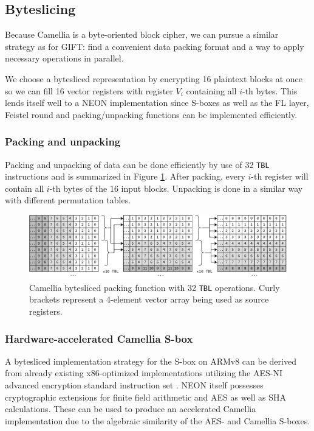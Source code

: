 \subsection{Byteslicing}

Because Camellia is a byte-oriented block cipher, we can pursue a similar
strategy as for GIFT: find a convenient data packing format and a way to apply
necessary operations in parallel.

We choose a bytesliced representation by encrypting 16 plaintext blocks at once
so we can fill 16 vector registers with register $V_i$ containing all $i$-th
bytes. This lends itself well to a NEON implementation since S-boxes as well as
the FL layer, Feistel round and packing/unpacking functions can be implemented
efficiently.

\subsubsection{Packing and unpacking}

Packing and unpacking of data can be done efficiently by use of 32 \texttt{TBL}
instructions and is summarized in Figure \ref{fig:byteslicing}. After
packing, every $i$-th register will contain all $i$-th bytes of the 16 input
blocks. Unpacking is done in a similar way with different permutation tables.

\begin{figure}[h!]
    \centering
    \includegraphics[width=\textwidth]{Figures/byteslicing.pdf}
    \caption{Camellia bytesliced packing function with 32 \texttt{TBL} operations.
    Curly brackets represent a 4-element vector array being used as source registers.}
    \label{fig:byteslicing}
\end{figure}

\subsubsection{Hardware-accelerated Camellia S-box}

A bytesliced implementation strategy for the S-box on ARMv8 can be derived
from already existing x86-optimized implementations utilizing the AES-NI
advanced encryption standard instruction set \cite{bcfastimplx86:2013}. NEON
itself possesses cryptographic extensions for finite field arithmetic and AES
as well as SHA calculations. These can be used to produce an accelerated
Camellia implementation due to the algebraic similarity of the AES- and
Camellia S-boxes.

